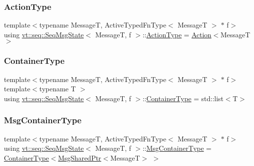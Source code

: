 \mbox{\label{structvt_1_1seq_1_1_seq_msg_state_aaca45f0ba55ada8eb7b66f0fd9cab501}} 
\subsubsection{\texorpdfstring{Action\+Type}{ActionType}}
{\footnotesize\ttfamily template$<$typename MessageT, Active\+Typed\+Fn\+Type$<$ Message\+T $>$ $\ast$ f$>$ \\
using \hyperlink{structvt_1_1seq_1_1_seq_msg_state}{vt\+::seq\+::\+Seq\+Msg\+State}$<$ MessageT, f $>$\+::\hyperlink{structvt_1_1seq_1_1_seq_msg_state_aaca45f0ba55ada8eb7b66f0fd9cab501}{Action\+Type} =  \hyperlink{structvt_1_1seq_1_1_action}{Action}$<$MessageT$>$}

\mbox{\label{structvt_1_1seq_1_1_seq_msg_state_ad68f7069acda4ef74f973422f368c6e1}} 
\subsubsection{\texorpdfstring{Container\+Type}{ContainerType}}
{\footnotesize\ttfamily template$<$typename MessageT, Active\+Typed\+Fn\+Type$<$ Message\+T $>$ $\ast$ f$>$ \\
template$<$typename T $>$ \\
using \hyperlink{structvt_1_1seq_1_1_seq_msg_state}{vt\+::seq\+::\+Seq\+Msg\+State}$<$ MessageT, f $>$\+::\hyperlink{structvt_1_1seq_1_1_seq_msg_state_ad68f7069acda4ef74f973422f368c6e1}{Container\+Type} =  std\+::list$<$T$>$}

\mbox{\label{structvt_1_1seq_1_1_seq_msg_state_a6821f61ac6a41b210001f49224ed4c9e}} 
\subsubsection{\texorpdfstring{Msg\+Container\+Type}{MsgContainerType}}
{\footnotesize\ttfamily template$<$typename MessageT, Active\+Typed\+Fn\+Type$<$ Message\+T $>$ $\ast$ f$>$ \\
using \hyperlink{structvt_1_1seq_1_1_seq_msg_state}{vt\+::seq\+::\+Seq\+Msg\+State}$<$ MessageT, f $>$\+::\hyperlink{structvt_1_1seq_1_1_seq_msg_state_a6821f61ac6a41b210001f49224ed4c9e}{Msg\+Container\+Type} =  \hyperlink{structvt_1_1seq_1_1_seq_msg_state_ad68f7069acda4ef74f973422f368c6e1}{Container\+Type}$<$\hyperlink{namespacevt_ab2b3d506ec8e8d1540aede826d84a239}{Msg\+Shared\+Ptr}$<$MessageT$>$ $>$}


